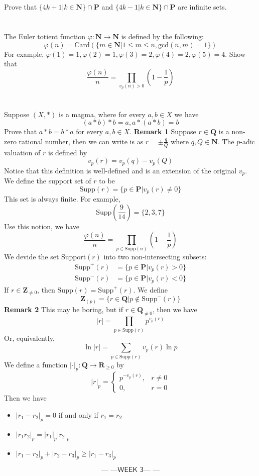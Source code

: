 \documentclass{report}
\newcommand{\week}[1]{$$\textsf{--- ---WEEK #1--- ---}$$}
\begin{document}
\section{}
Prove that $\{4k+1|k \in \mathbf{N}\}\cap \mathbf{P}$ and $\{4k-1|k \in \mathbf{N}\}\cap \mathbf{P}$ are infinite sets.
\section{}
The Euler totient function $\varphi:\mathbf{N} \rightarrow \mathbf{N}$ is defined by the following:
\[\varphi(n)=  \text{Card}(\{m \in \mathbf{N}| 1\le m \le n, \text{gcd}(n,m)=1\})\]
For example, $\varphi(1) = 1, \varphi(2) = 1, \varphi(3) = 2, \varphi(4) = 2, \varphi (5) = 4$. Show that
\[\frac{\varphi(n)}{n} = \prod_{v_p(n) > 0} \left(1-\frac{1}{p}\right)\]
\section{}
Suppose $(X,*)$ is a magma, where for every $a,b \in X$ we have
\[(a*b)*b=a,a*(a*b)=b\]
Prove that $a*b=b*a$ for every $a,b \in X$.
\newpage\textbf{Remark 1}\newline
Suppose $r \in \mathbf{Q}$ is a non-zero rational number, then we can write is as $r = \pm \frac{q}{Q}$ where $q,Q \in \mathbf{N}$. The $p$-adic valuation of $r$ is defined by
\[v_p(r) = v_p(q) - v_p(Q)\]
Notice that this definition is well-defined and is an extension of the original $v_p$. We define the support set of $r$ to be
\[\text{Supp}(r) = \{p \in \mathbf{P}| v_p(r) \neq 0\}\]
This set is always finite. For example,
\[\text{Supp}\left(\frac{9}{14}\right) = \{2,3,7\}\]
Use this notion, we have
\[\frac{\varphi(n)}{n} = \prod_{p \in \text{Supp}(n)}\left(1-\frac{1}{p}\right)\]
We devide the set $\text{Support}(r)$ into two non-intersecting subsets:
\begin{align*}
\text{Supp}^+(r) &=\{p \in \mathbf{P}| v_p(r)  > 0\}\\
\text{Supp}^-(r) &=\{p \in \mathbf{P}| v_p(r)  < 0\}
\end{align*}
If $r \in \mathbf{Z}_{\neq 0}$, then $\text{Supp}(r) = \text{Supp}^+(r) $. We define
\[\mathbf{Z}_{(p)} = \{r \in \mathbf{Q}|p \notin \text{Supp}^-(r)\}\]
\newline
\textbf{Remark 2}\newline
This may be boring, but if $r \in \mathbf{Q}_{\neq 0}$, then we have
\[|r| = \prod_{p \in \text{Supp}(r)} p^{v_p(r)}\]
Or, equivalently,
\[\ln |r| = \sum_{p \in \text{Supp}(r)} v_p(r) \ln p\]
We define a function $|\cdot|_p: \mathbf{Q} \rightarrow \mathbf{R}_{\ge 0}$ by
\[|r|_p=\begin{cases}p^{-v_p(r)},& r\neq 0\\0,&r=0\end{cases}\]
Then we have
\begin{itemize}
\item $|r_1-r_2|_p = 0$ if and only if $r_1 = r_2$
\item $|r_1r_2|_p = |r_1|_p|r_2|_p$
\item $|r_1-r_2|_p+|r_2-r_3|_p \ge |r_1-r_3|_p$
\end{itemize}
\newpage
\week{3}
\end{document}
